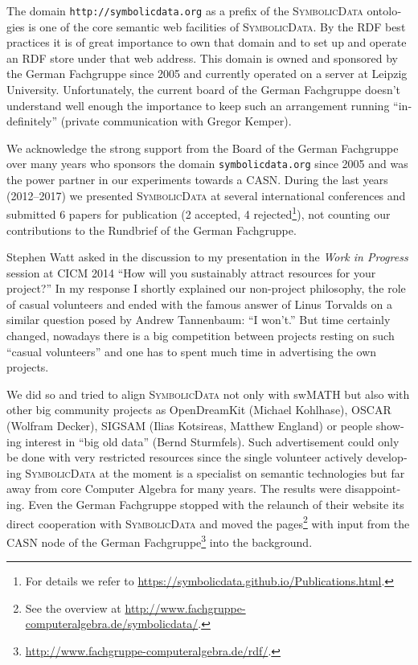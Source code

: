 \documentclass[11pt]{article}
\def\SD{\textsc{SymbolicData}}
\begin{document}
\begin{otherlanguage}{english}
\begin{multicols}{2}
The domain \texttt{http://symbolicdata.org} as a prefix of the {\SD} ontologies
is one of the core semantic web facilities of {\SD}.  By the RDF best practices
it is of great importance to own that domain and to set up and operate an RDF
store under that web address.  This domain is owned and sponsored by the German
Fachgruppe since 2005 and currently operated on a server at Leipzig University.
Unfortunately, the current board of the German Fachgruppe doesn't understand
well enough the importance to keep such an arrangement running ``indefinitely''
(private communication with Gregor Kemper).


We acknowledge the strong support from the Board of the German Fachgruppe over
many years who sponsors the domain \texttt{symbolicdata.org} since 2005 and was
the power partner in our experiments towards a CASN. During the last years
(2012--2017) we presented {\SD} at several international conferences and
submitted 6 papers for publication (2 accepted, 4 rejected\footnote{For details
  we refer to \url{https://symbolicdata.github.io/Publications.html}.}), not
counting our contributions to the Rundbrief of the German Fachgruppe.

Stephen Watt asked in the discussion to my presentation in the \emph{Work in
  Progress} session at CICM 2014 ``How will you sustainably attract resources
for your project?'' In my response I shortly explained our non-project
philosophy, the role of casual volunteers and ended with the famous answer of
Linus Torvalds on a similar question posed by Andrew Tannenbaum: ``I won't.''
But time certainly changed, nowadays there is a big competition between
projects resting on such ``casual volunteers'' and one has to spent much time
in advertising the own projects.

We did so and tried to align {\SD} not only with swMATH but also with other big
community projects as OpenDreamKit (Michael Kohlhase), OSCAR (Wolfram Decker),
SIGSAM (Ilias Kotsireas, Matthew England) or people showing interest in ``big
old data'' (Bernd Sturmfels). Such advertisement could only be done with very
restricted resources since the single volunteer actively developing {\SD} at
the moment is a specialist on semantic technologies but far away from core
Computer Algebra for many years.  The results were disappointing.  Even the
German Fachgruppe stopped with the relaunch of their website its direct
cooperation with {\SD} and moved the pages\footnote{See the overview at
  \url{http://www.fachgruppe-computeralgebra.de/symbolicdata/}.} with input
from the CASN node of the German
Fachgruppe\footnote{\url{http://www.fachgruppe-computeralgebra.de/rdf/}.} into
the background.


\end{multicols}
\end{otherlanguage}
\end{document}
